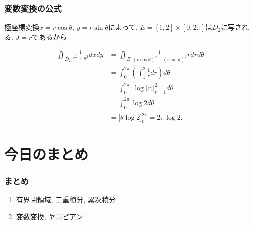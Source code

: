 \documentclass[dvipdfmx,cjk,10.2pt]{beamer}
\theoremstyle{definition}
\begin{document}

\begin{frame}
\frametitle{変数変換の公式}

極座標変換$x=r \cos \theta$, $y=r \sin \theta$によって, $E= [1,2] \times [0, 2\pi]$は$D_2$に写される. 
$J=r$であるから

\begin{align*}
\iint_{D_2} \frac{1}{x^2+y^2}dxdy & = \iint_E \frac{1}{(r \cos \theta)^2+(r\sin \theta)^2}r dr d \theta \\
& = \int_0^{2\pi} (\int_1^2 \frac{1}{r}dr) d\theta \\
& = \int_0^{2\pi} \big[ \log|r| \big]_{r=1}^{2}d\theta \\
& = \int_0^{2\pi} \log 2 d\theta \\
& = \big[\theta \log 2\big]_0^{2\pi} = 2\pi \log 2. 
\end{align*}


\end{frame}







\section{今日のまとめ}
\begin{frame}
\frametitle{まとめ}   


\begin{enumerate}
\item 有界閉領域, 二重積分, 累次積分
\item 変数変換, ヤコビアン
\end{enumerate} 

\end{frame}
\end{document}
